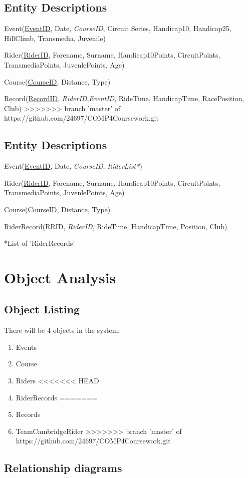 \subsection{Entity Descriptions}
Event(\underline{EventID}, Date, \emph{CourseID}, Circuit Series, Handicap10, Handicap25, HillClimb, Transmedia, Juvenile)

Rider(\underline{RiderID}, Forename, Surname, Handicap10Points, CircuitPoints, TransmediaPoints, JuvenlePoints, Age)

Course(\underline{CourseID}, Distance, Type)

Record(\underline{RecordID}, \emph{RiderID},\emph{EventID}, RideTime, HandicapTime, RacePosition, Club)
>>>>>>> branch 'master' of https://github.com/24697/COMP4Coursework.git


\subsection{Entity Descriptions}
Event(\underline{EventID}, Date, \emph{CourseID}, \emph{RiderList*})

Rider(\underline{RiderID}, Forename, Surname, Handicap10Points, CircuitPoints, TransmediaPoints, JuvenlePoints, Age)

Course(\underline{CourseID}, Distance, Type)

RiderRecord(\underline{RRID}, \emph{RiderID}, RideTime, HandicapTime, Position, Club)

*List of 'RiderRecords'
\section{Object Analysis}

\subsection{Object Listing}
There will be 4 objects in the system:

\begin{enumerate}
    \item Events
    \item Course
    \item Riders
<<<<<<< HEAD
    \item RiderRecords
=======
    \item Records
    \item TeamCambridgeRider
>>>>>>> branch 'master' of https://github.com/24697/COMP4Coursework.git
\end{enumerate}
\subsection{Relationship diagrams}

